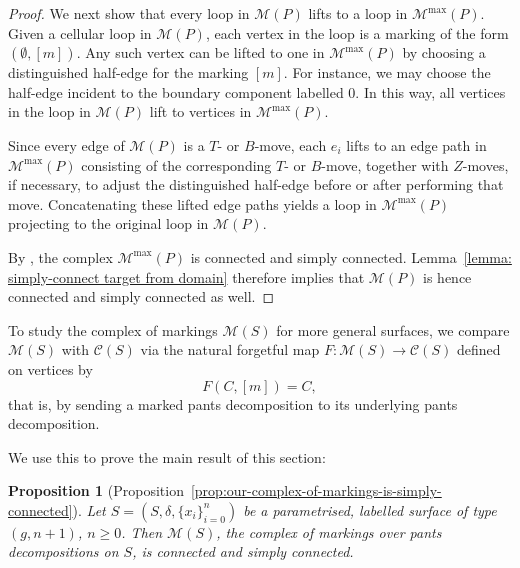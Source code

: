 \documentclass{amsart}
\newcommand{\pantscpx}{\mathcal{C}}
\newcommand{\markS}{\mathcal{M}(S)}
\newtheorem*{prop*}{Proposition}%
\theoremstyle{definition}
\numberwithin{equation}{section}
\begin{document}
\begin{proof}
We next show that every loop in $\mathcal M(P)$ lifts to a loop in $\mathcal M^{\max}(P)$. Given a cellular loop in $\mathcal{M}(P)$, each vertex in the loop is a marking of the form $(\emptyset,[m])$. Any such vertex can be lifted to one in $\mathcal{M}^{\max}(P)$ by choosing a distinguished half-edge for the marking $[m]$. For instance, we may choose the half-edge incident to the boundary component labelled $0$. In this way, all vertices in the loop in $\mathcal{M}(P)$ lift to vertices in $\mathcal{M}^{\max}(P)$.

Since every edge of $\mathcal M(P)$ is a $T$- or $B$-move, each $e_i$ lifts to an edge path in $\mathcal M^{\max}(P)$ consisting of the corresponding $T$- or $B$-move, together with $Z$-moves, if necessary, to adjust the distinguished half-edge before or after performing that move. Concatenating these lifted edge paths yields a loop in $\mathcal M^{\max}(P)$ projecting to the original loop in $\mathcal M(P)$.

By \cite[Theorem~4.9]{bk_marked_surfaces}, the complex $\mathcal M^{\max}(P)$ is connected and simply connected. Lemma~\ref{lemma: simply-connect target from domain} therefore implies that $\mathcal M(P)$ is hence connected and simply connected as well.
\end{proof}


To study the complex of markings $\markS$ for more general surfaces, we compare $\markS$ with $\pantscpx(S)$ via the natural forgetful map $F:\markS\longrightarrow \pantscpx(S)$ defined on vertices by
\[
F(C,[m])=C,
\]
that is, by sending a marked pants decomposition to its underlying pants decomposition.

We use this to prove the main result of this section:

\begin{prop*}[Proposition~\ref{prop:our-complex-of-markings-is-simply-connected}]
    Let $S=(S, \delta, \{x_{i}\}_{i=0}^{n})$ be a parametrised, labelled surface of type $(g,n+1)$, $n\geq 0$. Then $\markS$, the complex of markings over pants decompositions on $S$, is connected and simply connected.
\end{prop*}
\end{document}
